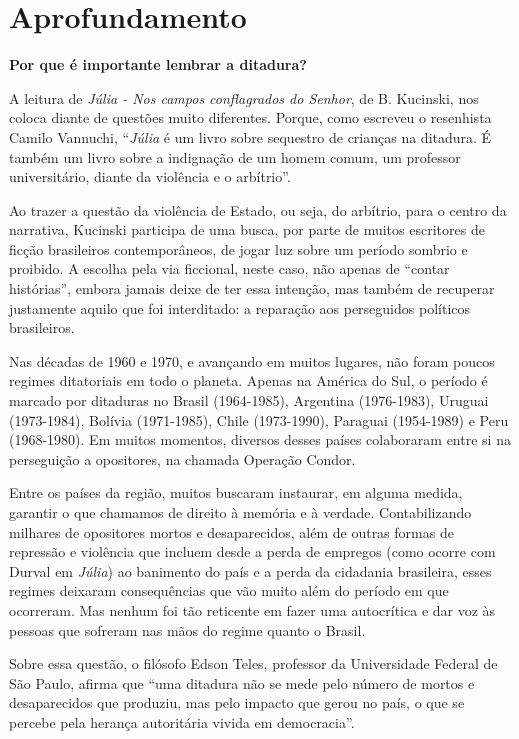 \documentclass[12pt]{extarticle}
\begin{document}
\section{Aprofundamento}

\textbf{Por que é importante lembrar a ditadura?}

A leitura de \emph{Júlia - Nos campos conflagrados do Senhor}, de B.
Kucinski, nos coloca diante de questões muito diferentes. Porque, como
escreveu o resenhista Camilo Vannuchi, ``\emph{Júlia} é um livro sobre
sequestro de crianças na ditadura. É também um livro sobre a indignação
de um homem comum, um professor universitário, diante da violência e o
arbítrio''.

Ao trazer a questão da violência de Estado, ou seja, do arbítrio, para o
centro da narrativa, Kucinski participa de uma busca, por parte de
muitos escritores de ficção brasileiros contemporâneos, de jogar luz
sobre um período sombrio e proibido. A escolha pela via ficcional, neste
caso, não apenas de ``contar histórias'', embora jamais deixe de ter
essa intenção, mas também de recuperar justamente aquilo que foi
interditado: a reparação aos perseguidos políticos brasileiros.

Nas décadas de 1960 e 1970, e avançando em muitos lugares, não foram
poucos regimes ditatoriais em todo o planeta. Apenas na América do Sul,
o período é marcado por ditaduras no Brasil (1964-1985), Argentina
(1976-1983), Uruguai (1973-1984), Bolívia (1971-1985), Chile
(1973-1990), Paraguai (1954-1989) e Peru (1968-1980). Em muitos
momentos, diversos desses países colaboraram entre si na perseguição a
opositores, na chamada Operação Condor.

Entre os países da região, muitos buscaram instaurar, em alguma medida,
garantir o que chamamos de direito à memória e à verdade. Contabilizando
milhares de opositores mortos e desaparecidos, além de outras formas de
repressão e violência que incluem desde a perda de empregos (como ocorre
com Durval em \emph{Júlia}) ao banimento do país e a perda da cidadania
brasileira, esses regimes deixaram consequências que vão muito além do
período em que ocorreram. Mas nenhum foi tão reticente em fazer uma
autocrítica e dar voz às pessoas que sofreram nas mãos do regime quanto
o Brasil.

Sobre essa questão, o filósofo Edson Teles, professor da Universidade
Federal de São Paulo, afirma que ``uma ditadura não se mede pelo número
de mortos e desaparecidos que produziu, mas pelo impacto que gerou no
país, o que se percebe pela herança autoritária vivida em democracia''.
\end{document}
